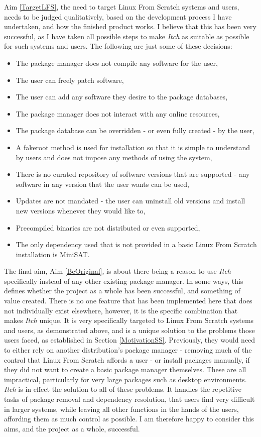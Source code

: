\documentclass[10pt]{article}
\begin{document}
Aim \ref{TargetLFS}, the need to target Linux From Scratch systems and users, needs to be judged qualitatively, based on the development process I have undertaken, and how the finished product works. I believe that this has been very successful, as I have taken all possible steps to make \textit{Itch} as suitable as possible for such systems and users. The following are just some of these decisions:
\begin{itemize}
    \item The package manager does not compile any software for the user,
    \item The user can freely patch software,
    \item The user can add any software they desire to the package databases,
    \item The package manager does not interact with any online resources,
    \item The package database can be overridden - or even fully created - by the user,
    \item A fakeroot method is used for installation so that it is simple to understand by users and does not impose any methods of using the system,
    \item There is no curated repository of software versions that are supported - any software in any version that the user wants can be used,
    \item Updates are not mandated - the user can uninstall old versions and install new versions whenever they would like to,
    \item Precompiled binaries are not distributed or even supported,
    \item The only dependency used that is not provided in a basic Linux From Scratch installation is MiniSAT.
\end{itemize}

The final aim, Aim \ref{BeOriginal}, is about there being a reason to use \textit{Itch} specifically instead of any other existing package manager. In some ways, this defines whether the project as a whole has been successful, and something of value created. There is no one feature that has been implemented here that does not individually exist elsewhere, however, it is the specific combination that makes \textit{Itch} unique. It is very specifically targeted to Linux From Scratch systems and users, as demonstrated above, and is a unique solution to the problems those users faced, as established in Section \ref{MotivationSS}. Previously, they would need to either rely on another distribution's package manager - removing much of the control that Linux From Scratch affords a user - or install packages manually, if they did not want to create a basic package manager themselves. These are all impractical, particularly for very large packages such as desktop environments. \textit{Itch} is in effect the solution to all of these problems. It handles the repetitive tasks of package removal and dependency resolution, that users find very difficult in larger systems, while leaving all other functions in the hands of the users, affording them as much control as possible. I am therefore happy to consider this aims, and the project as a whole, successful.
\end{document}
